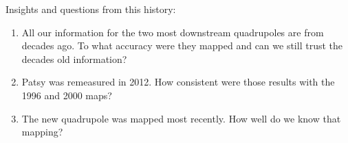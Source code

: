 \documentclass[12pt]{article}
\begin{document}
Insights and questions from this history:
\begin{enumerate}
\item{All our information for the two most downstream quadrupoles are from decades ago. To what accuracy were they mapped and can we still trust the decades old information?}
\item{Patsy was remeasured in 2012. How consistent were those results with the 1996 and 2000 maps?}
\item{The new quadrupole was mapped most recently. How well do we know that mapping?}
\end{enumerate}


%


\end{document}
